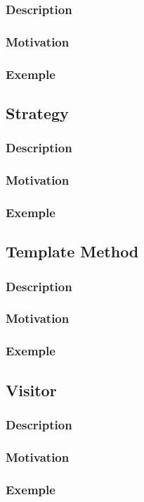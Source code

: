 \documentclass[french]{article}
\begin{document}
\subsubsection{Description}

\subsubsection{Motivation}

\subsubsection{Exemple}



\subsection{Strategy}

\subsubsection{Description}

\subsubsection{Motivation}

\subsubsection{Exemple}



\subsection{Template Method}

\subsubsection{Description}

\subsubsection{Motivation}

\subsubsection{Exemple}



\subsection{Visitor}

\subsubsection{Description}

\subsubsection{Motivation}

\subsubsection{Exemple}
\end{document}
